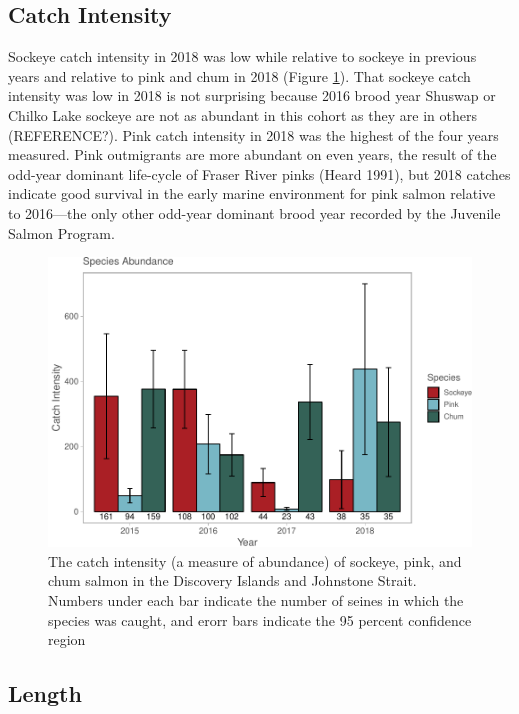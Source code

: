 \documentclass[fleqn,10pt]{wlpeerj} %
\begin{document}
\subsection*{Catch Intensity}\label{catch-intensity}

Sockeye catch intensity in 2018 was low while relative to sockeye in
previous years and relative to pink and chum in 2018 (Figure
\ref{fig:catchintensity}). That sockeye catch intensity was low in 2018
is not surprising because 2016 brood year Shuswap or Chilko Lake sockeye
are not as abundant in this cohort as they are in others (REFERENCE?).
Pink catch intensity in 2018 was the highest of the four years measured.
Pink outmigrants are more abundant on even years, the result of the
odd-year dominant life-cycle of Fraser River pinks (Heard 1991), but
2018 catches indicate good survival in the early marine environment for
pink salmon relative to 2016---the only other odd-year dominant brood
year recorded by the Juvenile Salmon Program.

\begin{figure}[H]
\includegraphics[width=0.9\linewidth]{peer_j_migration_dynamics_files/figure-latex/catchintensity-1} \caption{The catch intensity (a measure of abundance) of sockeye, pink, and chum salmon in the Discovery Islands and Johnstone Strait. Numbers under each bar indicate the number of seines in which the species was caught, and erorr bars indicate the 95 percent confidence region}\label{fig:catchintensity}
\end{figure}

\subsection*{Length}\label{length}
\end{document}
